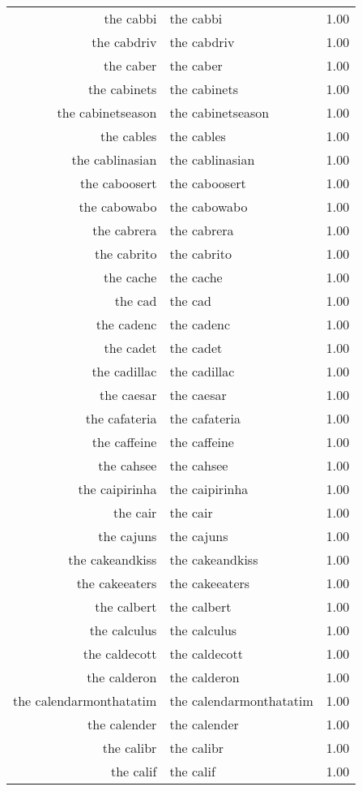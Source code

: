 \begin{table}[ht]
\begin{tabular}{rlr}
  the cabbi & the cabbi & 1.00 \\ 
  the cabdriv & the cabdriv & 1.00 \\ 
  the caber & the caber & 1.00 \\ 
  the cabinets & the cabinets & 1.00 \\ 
  the cabinetseason & the cabinetseason & 1.00 \\ 
  the cables & the cables & 1.00 \\ 
  the cablinasian & the cablinasian & 1.00 \\ 
  the caboosert & the caboosert & 1.00 \\ 
  the cabowabo & the cabowabo & 1.00 \\ 
  the cabrera & the cabrera & 1.00 \\ 
  the cabrito & the cabrito & 1.00 \\ 
  the cache & the cache & 1.00 \\ 
  the cad & the cad & 1.00 \\ 
  the cadenc & the cadenc & 1.00 \\ 
  the cadet & the cadet & 1.00 \\ 
  the cadillac & the cadillac & 1.00 \\ 
  the caesar & the caesar & 1.00 \\ 
  the cafateria & the cafateria & 1.00 \\ 
  the caffeine & the caffeine & 1.00 \\ 
  the cahsee & the cahsee & 1.00 \\ 
  the caipirinha & the caipirinha & 1.00 \\ 
  the cair & the cair & 1.00 \\ 
  the cajuns & the cajuns & 1.00 \\ 
  the cakeandkiss & the cakeandkiss & 1.00 \\ 
  the cakeeaters & the cakeeaters & 1.00 \\ 
  the calbert & the calbert & 1.00 \\ 
  the calculus & the calculus & 1.00 \\ 
  the caldecott & the caldecott & 1.00 \\ 
  the calderon & the calderon & 1.00 \\ 
  the calendarmonthatatim & the calendarmonthatatim & 1.00 \\ 
  the calender & the calender & 1.00 \\ 
  the calibr & the calibr & 1.00 \\ 
  the calif & the calif & 1.00 \\ 

\end{tabular}
\end{table}
